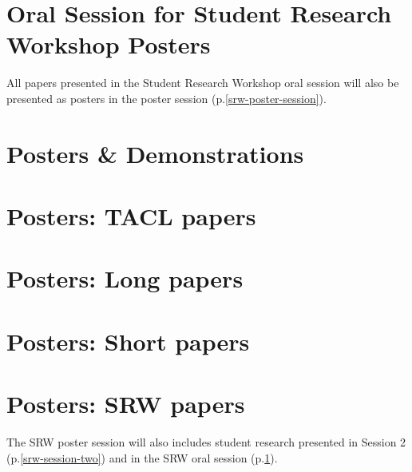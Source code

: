 \newpage

\section[SRW Oral Session]{Oral Session for Student Research Workshop Posters}
\label{srw-oral-session}

All papers presented in the Student Research Workshop oral session
will also be presented as posters in the poster session (p.\ref{srw-poster-session}).

\newpage
\section{Posters \& Demonstrations}


\section*{Posters: TACL papers}


\section*{Posters: Long papers}


\section*{Posters: Short papers}


\section*{Posters: SRW papers}
\label{srw-poster-session}

The SRW poster session will also includes student research presented
in Session 2 (p.\ref{srw-session-two}) and in the SRW oral session
(p.\ref{srw-oral-session}).


